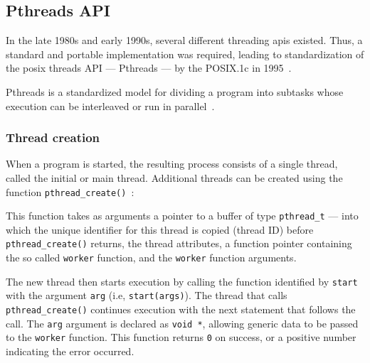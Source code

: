 \subsection{Pthreads API}
\label{sec:pthreads-api}
In the late 1980s and early 1990s, several different threading \gls{api}s
existed. Thus, a standard and portable implementation was required, leading to
standardization of the \gls{posix} threads API --- Pthreads --- by the POSIX.1c
in 1995~\cite{kerrisk2010linux}.

Pthreads is a standardized model for dividing a program into subtasks whose
execution can be interleaved or run in parallel~\cite{buttlar1996pthreads}.

\subsubsection{Thread creation}
\label{sec:thread-creation}
When a program is started, the resulting process consists of a single thread,
called the initial or main thread. Additional threads can be created using the
function \texttt{pthread\_create()}~\cite{kerrisk2010linux}:

% 
%
This function takes as arguments a pointer to a buffer of type
\texttt{pthread\_t} --- into which the unique identifier for this thread is
copied (thread ID) before \texttt{pthread\_create()} returns, the thread attributes, a function pointer containing
the so called \texttt{worker} function, and the \texttt{worker} function
arguments.

The new thread then starts execution by calling the function
identified by \texttt{start} with the argument \texttt{arg} (i.e,
\texttt{start(args)}). The thread that calls \texttt{pthread\_create()}
continues execution with the next statement that follows the call. The
\texttt{arg} argument is declared as \texttt{void *}, allowing generic data to
be passed to the \texttt{worker} function. This function returns \texttt{0} on
success, or a positive number indicating the error occurred. 
%
